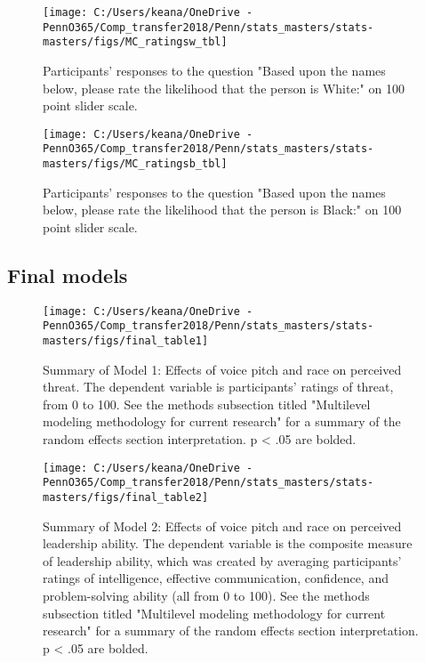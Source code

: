 \documentclass[
  english,
  man, noextraspace,floatsintext]{apa6}
\begin{document}
\begin{figure}

{\centering \texttt{[image: C:/Users/keana/OneDrive - PennO365/Comp\_transfer2018/Penn/stats\_masters/stats-masters/figs/MC\_ratingsw\_tbl]} 

}

\caption{Participants' responses to the question "Based upon the names below, please rate the likelihood that the person is White:" on 100 point slider scale.}\label{fig:f3}
\end{figure}

\begin{figure}

{\centering \texttt{[image: C:/Users/keana/OneDrive - PennO365/Comp\_transfer2018/Penn/stats\_masters/stats-masters/figs/MC\_ratingsb\_tbl]} 

}

\caption{Participants' responses to the question "Based upon the names below, please rate the likelihood that the person is Black:" on 100 point slider scale.}\label{fig:f4}
\end{figure}

\hypertarget{final-models}{%
\subsection{Final models}\label{final-models}}

\begin{figure}

{\centering \texttt{[image: C:/Users/keana/OneDrive - PennO365/Comp\_transfer2018/Penn/stats\_masters/stats-masters/figs/final\_table1]} 

}

\caption{Summary of Model 1: Effects of voice pitch and race on perceived threat. The dependent variable is participants' ratings of threat, from 0 to 100. See the methods subsection titled "Multilevel modeling methodology for current research" for a summary of the random effects section interpretation. p < .05 are bolded.}\label{fig:f5}
\end{figure}

\begin{figure}

{\centering \texttt{[image: C:/Users/keana/OneDrive - PennO365/Comp\_transfer2018/Penn/stats\_masters/stats-masters/figs/final\_table2]} 

}

\caption{Summary of Model 2: Effects of voice pitch and race on perceived leadership ability. The dependent variable is the composite measure of leadership ability, which was created by averaging participants' ratings of intelligence, effective communication, confidence, and problem-solving ability (all from 0 to 100). See the methods subsection titled "Multilevel modeling methodology for current research" for a summary of the random effects section interpretation. p < .05 are bolded.}\label{fig:f6}
\end{figure}
\end{document}
